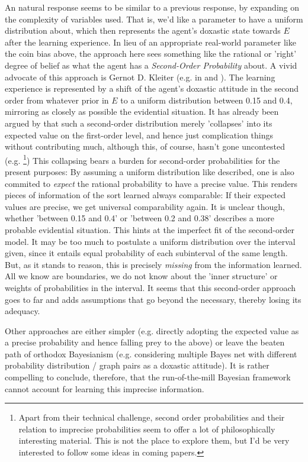 \documentclass[11pt, a4paper]{scrartcl}
\begin{document}
An natural response seems to be similar to a previous response, by expanding on the complexity of variables used. That is, we'd like a parameter to have a uniform distribution about, which then represents the agent's doxastic state towards $E$ after the learning experience. In lieu of an appropriate real-world parameter like the coin bias above, the approach here sees something like the rational or 'right' degree of belief as what the agent has a \emph{Second-Order Probability} about. A vivid advocate of this approach is Gernot D. Kleiter (e.g. in \citet{KLEITER1996143} and \citet{Pfeifer2007-PFEHRW}). The learning experience is represented by a shift of the agent's doxastic attitude in the second order from whatever prior in $E$ to a uniform distribution between 0.15 and 0.4, mirroring as closely as possible the evidential situation. It has already been argued by \citet[p.58]{Savage1954-SAVTFO-2} that such a second-order distribution merely 'collapses' into its expected value on the first-order level, and hence just complication things without contributing much, although this, of course, hasn't gone uncontested (e.g. \citet{Hansson2008-HANDWN}\footnote{Apart from their technical challenge, second order probabilities and their relation to imprecise probabilities seem to offer a lot of philosophically interesting material. This is not the place to explore them, but I'd be very interested to follow some ideas in coming papers.}) This collapsing bears a burden for second-order probabilities for the present purposes: By assuming a uniform distribution like described, one is also commited to \emph{expect} the rational probability to have a precise value. This renders pieces of information of the sort learned always comparable: If their expected values are precise, we get universal comparability again. It is unclear though, whether 'between 0.15 and 0.4' or 'between 0.2 and 0.38' describes a more probable evidential situation. This hints at the imperfect fit of the second-order model. It may be too much to postulate a uniform distribution over the interval given, since it entails equal probability of each subinterval of the same length. But, as it stands to reason, this is precisely \emph{missing} from the information learned. All we know are boundaries, we do not know about the 'inner structure' or weights of probabilities in the interval. It seems that this second-order approach goes to far and adds assumptions that go beyond the necessary, thereby losing its adequacy. 

Other approaches are either simpler (e.g. directly adopting the expected value as a precise probability and hence falling prey to the above) or leave the beaten path of orthodox Bayesianism (e.g. considering multiple Bayes net with different probability distribution / graph pairs as a doxastic attitude). It is rather compelling to conclude, therefore, that the run-of-the-mill Bayesian framework cannot account for learning this imprecise information. 
\end{document}

